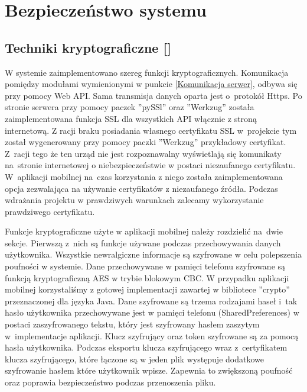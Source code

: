 \newpage
\section{Bezpieczeństwo systemu \textsl{\NazwaSys}} \label{sec:bezpieczenstwo}


\subsection[Techniki kryptograficzne]{Techniki kryptograficzne [\StudentB]}
W systemie \textsl{\NazwaSys} zaimplementowano szereg funkcji kryptograficznych. Komunikacja pomiędzy modułami wymienionymi w punkcie \ref{Komunikacja serwer}, \linebreak odbywa się przy pomocy Web API. Sama transmisja danych oparta jest o~protokół Https. Po stronie serwera przy pomocy paczek ''pySSl'' oraz ''Werkzug'' została zaimplementowana funkcja SSL dla wszystkich API włącznie z stroną internetową. Z racji braku posiadania własnego certyfikatu SSL w~projekcie tym został wygenerowany przy pomocy paczki ''Werkzug'' przykładowy certyfikat. Z~racji tego że ten urząd nie jest rozpoznawalny wyświetlają się komunikaty na~stronie internetowej o niebezpieczeństwie w postaci niezaufanego certyfikatu. W~aplikacji mobilnej na~czas korzystania z niego została zaimplementowana opcja zezwalająca na używanie certyfikatów z niezaufanego źródła. Podczas wdrażania projektu w prawdziwych warunkach zalecamy wykorzystanie prawdziwego certyfikatu.

Funkcje kryptograficzne użyte w aplikacji mobilnej należy rozdzielić na~dwie sekcje. Pierwszą z~nich są funkcje używane podczas przechowywania danych użytkownika. Wszystkie newralgiczne informacje są szyfrowane w celu polepszenia poufności w systemie. Dane przechowywane w pamięci telefonu szyfrowane są funkcją kryptograficzną AES w trybie blokowym CBC. W przypadku aplikacji mobilnej korzystaliśmy z gotowej implementacji zawartej w bibliotece ''crypto'' przeznaczonej dla języka Java. Dane szyfrowane są trzema rodzajami haseł i~tak hasło użytkownika przechowywane jest w pamięci telefonu (SharedPreferences) w postaci zaszyfrowanego tekstu, który jest szyfrowany hasłem zaszytym w~implementacje aplikacji. Klucz szyfrujący oraz token szyfrowane są za pomocą hasła użytkownika. Podczas eksportu klucza szyfrującego wraz z~certyfikatem klucza szyfrującego, które łączone są w jeden plik   występuje dodatkowe szyfrowanie hasłem które użytkownik wpisze. Zapewnia to zwiększoną poufność oraz poprawia bezpieczeństwo podczas przenoszenia pliku.                

